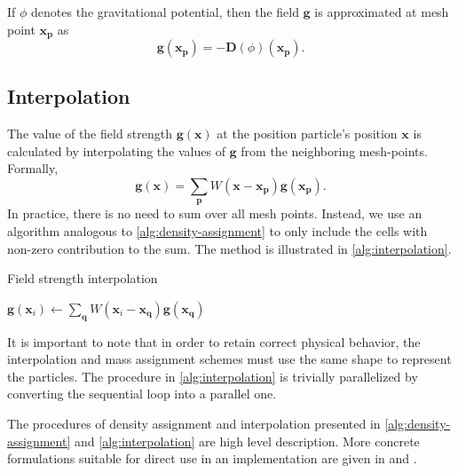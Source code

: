 If $\phi$ denotes the gravitational potential, then the field $\mathbf{g}$ is approximated at mesh point $\mathbf{x}_\mathbf{p}$ as
\begin{equation*}
    \mathbf{g}(\mathbf{x}_\mathbf{p}) = -\mathbf{D}(\phi)(\mathbf{x}_\mathbf{p}).
\end{equation*}

\subsection{Interpolation}
The value of the field strength $\mathbf{g}(\mathbf{x})$ at the position particle's position $\mathbf{x}$ is calculated by interpolating the values of $\mathbf{g}$ from the neighboring mesh-points.
Formally,
\begin{equation*}
    \mathbf{g}(\mathbf{x}) = \sum_\mathbf{p} W(\mathbf{x} - \mathbf{x}_\mathbf{p}) \mathbf{g}(\mathbf{x}_\mathbf{p}).
\end{equation*}
In practice, there is no need to sum over all mesh points.
Instead, we use an algorithm analogous to \autoref{alg:density-assignment} to only include the cells with non-zero contribution to the sum.
The method is illustrated in \autoref{alg:interpolation}.
\begin{algorithm}
    \caption{Field strength interpolation}\label{alg:interpolation}
    \begin{algorithmic}[1]
        \State $\mathbf{g}(\mathbf{x}_i) \gets \sum_\mathbf{q} W(\mathbf{x}_i - \mathbf{x}_\mathbf{q}) \mathbf{g}(\mathbf{x}_\mathbf{q})$
        \EndFor
        \EndFor
    \end{algorithmic}
\end{algorithm}
It is important to note that in order to retain correct physical behavior, the interpolation and mass assignment schemes must use the same shape to represent the particles.
The procedure in \autoref{alg:interpolation} is trivially parallelized by converting the sequential loop into a parallel one.

The procedures of density assignment and interpolation presented in \autoref{alg:density-assignment} and \autoref{alg:interpolation} are high level description.
More concrete formulations suitable for direct use in an implementation are given in \cite{Hockney1988} and \cite{Kravtsov2002PM}.

